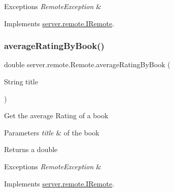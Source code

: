 \begin{DoxyExceptions}{Exceptions}
{\em Remote\+Exception} & \\
\hline
\end{DoxyExceptions}


Implements \hyperlink{interfaceserver_1_1remote_1_1_i_remote_ab24486281e8c228ee82a48a5ca70297b}{server.\+remote.\+I\+Remote}.

\mbox{\label{classserver_1_1remote_1_1_remote_afd253ddc199a34a1e05317878f957cc9}} 
\subsubsection{\texorpdfstring{average\+Rating\+By\+Book()}{averageRatingByBook()}}
{\footnotesize\ttfamily double server.\+remote.\+Remote.\+average\+Rating\+By\+Book (\begin{DoxyParamCaption}\item[{String}]{title }\end{DoxyParamCaption})}

Get the average Rating of a book 
\begin{DoxyParams}{Parameters}
{\em title} & of the book \\
\hline
\end{DoxyParams}
\begin{DoxyReturn}{Returns}
a double 
\end{DoxyReturn}

\begin{DoxyExceptions}{Exceptions}
{\em Remote\+Exception} & \\
\hline
\end{DoxyExceptions}


Implements \hyperlink{interfaceserver_1_1remote_1_1_i_remote_a4a53942c94debc835f1817b2753722de}{server.\+remote.\+I\+Remote}.

\mbox{\label{classserver_1_1remote_1_1_remote_a67fc7aeeb889a80cda6e1a5f83858c2a}} 

